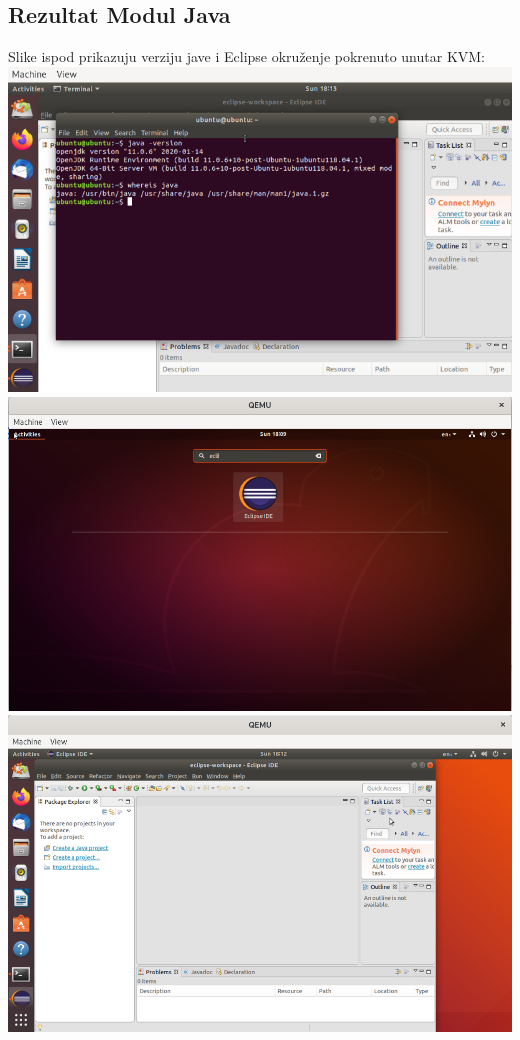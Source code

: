 \documentclass[12pt,vi]{mitthesis}
\begin{document}
\subsection*{Rezultat Modul Java}
\indent
Slike ispod prikazuju verziju jave i Eclipse okruženje pokrenuto unutar KVM:
\includegraphics[width=\linewidth]{images/javaLive.png} 
\includegraphics[width=\linewidth]{images/eclipseLive.png} 
\includegraphics[width=\linewidth]{images/eclipseLive1.png} 
\newpage
\end{document}

